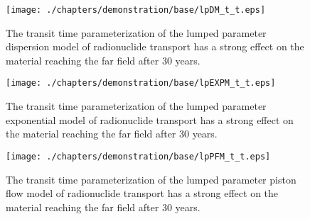 
\begin{frame}[ctb!]
\begin{figure}[ht]
\centering
\texttt{[image: ./chapters/demonstration/base/lpDM\_t\_t.eps]}
\caption[Lumped Parameter Dispersion Model Transit Time Sensitivity]{The transit time 
parameterization of the lumped parameter dispersion model of radionuclide 
transport has a strong effect on the material reaching the far field after 30 
years.  }
\label{fig:lp_t_t_begin}
\end{figure}
\end{frame}

\begin{frame}[ctb!]
\begin{figure}[ht]
\centering
\texttt{[image: ./chapters/demonstration/base/lpEXPM\_t\_t.eps]}
\caption[Lumped Parameter Exponential Model Transit Time Sensitivity]{The transit time 
parameterization of the lumped parameter exponential model of radionuclide 
transport has a strong effect on the material reaching the far field after 30 
years.  }
\end{figure}
\end{frame}

\begin{frame}[ctb!]
\begin{figure}[ht]
\centering
\texttt{[image: ./chapters/demonstration/base/lpPFM\_t\_t.eps]}
\caption[Lumped Parameter Piston Flow Model Transit Time Sensitivity]{The transit time 
parameterization of the lumped parameter piston flow model of radionuclide 
transport has a strong effect on the material reaching the far field after 30 
years.  }
\label{fig:lp_t_t_end}
\end{figure}
\end{frame}
